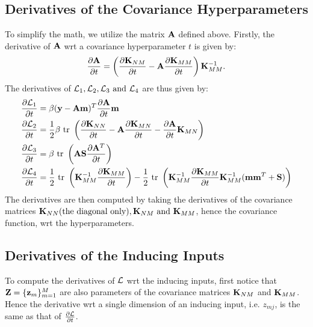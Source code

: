 \documentclass{article} %
\begin{document}
\subsection{Derivatives of the Covariance Hyperparameters}  
To simplify the math, we utilize the matrix $\mathbf{A}$ defined above.
Firstly, the derivative of $\mathbf{A}$ wrt a covariance hyperparameter $t$ is given by:
\begin{align}
\frac{\partial{\mathbf{A}}}{\partial{t}} = \left(\frac{\partial{\mathbf{K}_{NM}}}{\partial{t}} - \mathbf{A} \frac{\partial{\mathbf{K}_{MM}}}{\partial{t}}\right)\mathbf{K}_{MM}^{-1}.
\end{align}
The derivatives of $\mathcal{L}_1, \mathcal{L}_2, \mathcal{L}_3 \text{ and } \mathcal{L}_4$ are thus given by:
\begin{align}
\frac{\partial{\mathcal{L}_1}}{\partial{t}} &= \beta (\mathbf{y} - \mathbf{A}\mathbf{m})^T \frac{\partial{\mathbf{A}}}{\partial{t}} \mathbf{m} \\
\frac{\partial{\mathcal{L}_2}}{\partial{t}} &= \frac{1}{2}\beta \mbox{ \rm tr } \left(\frac{\partial{\mathbf{K}_{NN}}}{\partial{t}} - \mathbf{A} \frac{\partial{\mathbf{K}_{MN}}}{\partial{t}} - \frac{\partial{\mathbf{A}}}{\partial{t}} \mathbf{K}_{MN}\right) \\
\frac{\partial{\mathcal{L}_3}}{\partial{t}} &= \beta \mbox{ \rm tr } \left(\mathbf{A} \mathbf{S} \frac{\partial{\mathbf{A}^T}}{\partial{t}} \right) \\
\frac{\partial{\mathcal{L}_4}}{\partial{t}} &= \frac{1}{2}  \mbox{ \rm tr } \left(\mathbf{K}_{MM}^{-1} \frac{\partial{ \mathbf{K}_{MM}}}{\partial{t}}\right) - \frac{1}{2} \mbox{ \rm tr } \left(\mathbf{K}_{MM}^{-1} \frac{\partial{\mathbf{K}_{MM}}}{\partial{t}} \mathbf{K}_{MM}^{-1} (\mathbf{m} \mathbf{m}^T + \mathbf{S}) \right) 
\end{align}
The derivatives are then computed by taking the derivatives of the covariance matrices $\mathbf{K}_{NN} (\text{the diagonal only}), \mathbf{K}_{NM} \text{ and }  \mathbf{K}_{MM}$, hence the covariance function, wrt the hyperparameters. 

\subsection{Derivatives of the Inducing Inputs}
To compute the derivatives of $\mathcal{L}$ wrt the inducing inputs, first notice that $\mathbf{Z} = \{\mathbf{z}_m\}_{m=1}^M$ are also parameters of the covariance matrices $\mathbf{K}_{NM}$ and $\mathbf{K}_{MM}$.
Hence the derivative wrt a single dimension of an inducing input, i.e. $z_{mj}$, is the same as that of $\frac{\partial{ \mathcal{L}}}{\partial{t}}$.
\end{document}
